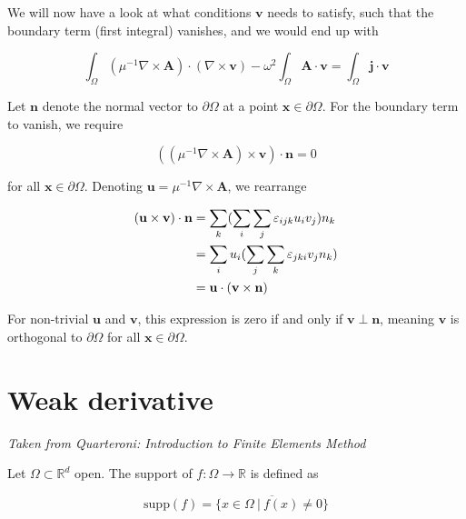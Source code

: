 \documentclass[11pt, a4paper]{article}
\begin{document}
We will now have a look at what conditions $\mathbf{v}$ needs to satisfy, such that
the boundary term (first integral) vanishes, and we would end up with

\begin{equation}
    \int_{\Omega} ({\mu^{-1} \nabla \times \mathbf{A}}) \cdot (\nabla \times \mathbf{v})
    - \omega^2 \int_{\Omega} \mathbf{A} \cdot \mathbf{v} 
    = \int_{\Omega} \mathbf{j} \cdot \mathbf{v} \label{equ:mwweaksimple}
\end{equation}

Let $\mathbf{n}$ denote the normal
vector to $\partial \Omega$ at a point $\mathbf{x} \in \partial \Omega$.
For the boundary term to vanish, we require 

\begin{equation}
    (({\mu^{-1} \nabla \times \mathbf{A}}) \times \mathbf{v}) \cdot \mathbf{n} = 0
\end{equation}

for all $\mathbf{x} \in \partial \Omega$. Denoting $\mathbf{u} = \mu^{-1} \nabla \times \mathbf{A}$,
we rearrange 

\begin{align}
    (\mathbf{u} \times \mathbf{v}) \cdot \mathbf{n} &= \sum_k (\sum_i \sum_j \varepsilon_{ijk} u_i v_j) n_k \notag \\
     &= \sum_i u_i (\sum_j \sum_k \varepsilon_{jki} v_j n_k) \notag \\ 
     &= \mathbf{u} \cdot (\mathbf{v} \times \mathbf{n}) \label{equ:label}
\end{align}

For non-trivial $\mathbf{u}$ and $\mathbf{v}$, this expression is zero if and only if 
$\mathbf{v} \perp \mathbf{n}$, meaning $\mathbf{v}$ is orthogonal to $\partial \Omega$ 
for all $\mathbf{x} \in \partial \Omega$. 

\section{Weak derivative}
\label{sec:weak}

\textit{Taken from Quarteroni: Introduction to Finite Elements Method}

Let $\Omega \subset \mathbb{R}^d$ open. The support of $f:\Omega \to \mathbb{R}$
is defined as

\begin{equation}
    \text{supp}(f) = \overline{\{x \in \Omega ~|~ f(x) \neq 0\}}
\end{equation}
\end{document}
